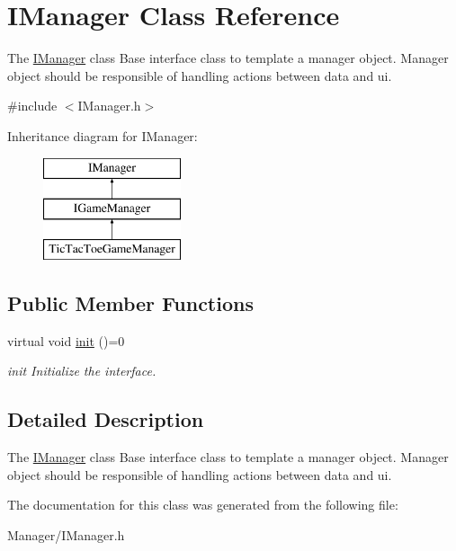 \hypertarget{class_i_manager}{}\section{I\+Manager Class Reference}
\label{class_i_manager}


The \hyperlink{class_i_manager}{I\+Manager} class Base interface class to template a manager object. Manager object should be responsible of handling actions between data and ui.  




{\ttfamily \#include $<$I\+Manager.\+h$>$}

Inheritance diagram for I\+Manager\+:\begin{figure}[H]
\begin{center}
\leavevmode
\includegraphics[height=3.000000cm]{class_i_manager}
\end{center}
\end{figure}
\subsection*{Public Member Functions}
\begin{DoxyCompactItemize}
\item 
\mbox{\label{class_i_manager_ae8b36e4b4178abc62b84bcf20a63aa5b}} 
virtual void \hyperlink{class_i_manager_ae8b36e4b4178abc62b84bcf20a63aa5b}{init} ()=0
\begin{DoxyCompactList}\small\item\em init Initialize the interface. \end{DoxyCompactList}\end{DoxyCompactItemize}


\subsection{Detailed Description}
The \hyperlink{class_i_manager}{I\+Manager} class Base interface class to template a manager object. Manager object should be responsible of handling actions between data and ui. 

The documentation for this class was generated from the following file\+:\begin{DoxyCompactItemize}
\item 
Manager/I\+Manager.\+h\end{DoxyCompactItemize}
